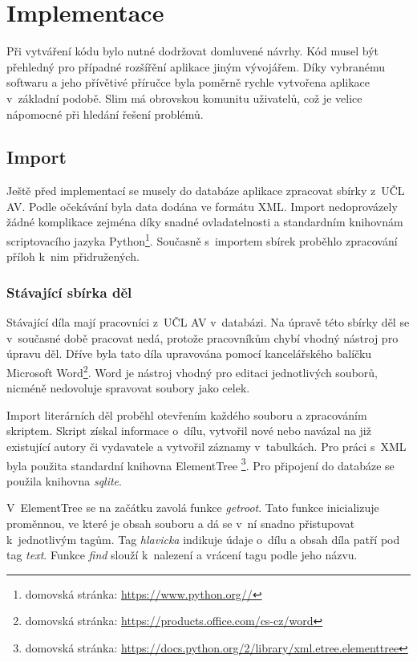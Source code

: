 \chapter{Implementace}
    Při vytváření kódu bylo nutné dodržovat domluvené návrhy. Kód musel být přehledný pro případné rozšířění aplikace jiným vývojářem. Díky vybranému softwaru a jeho přívětivé příručce byla poměrně rychle vytvořena aplikace v~základní podobě. Slim má obrovskou komunitu uživatelů, což je velice nápomocné při hledání řešení problémů. 

    \section{Import}
        Ještě před implementací se musely do databáze aplikace zpracovat sbírky z~UČL AV. Podle očekávání byla data dodána ve formátu XML. Import nedoprovázely žádné komplikace zejména díky snadné ovladatelnosti a standardním knihovnám scriptovacího jazyka Python\footnote{domovská stránka: \url{https://www.python.org//}}. Současně s~importem sbírek proběhlo zpracování příloh k~nim přidružených.
        
        \subsection{Stávající sbírka děl}
            Stávající díla mají pracovníci z~UČL AV v~databázi. Na úpravě této sbírky děl se v~současné době pracovat nedá, protože pracovníkům chybí vhodný nástroj pro úpravu děl. Dříve byla tato díla upravována pomocí kancelářského balíčku Microsoft Word\footnote{domovská stránka: \url{https://products.office.com/cs-cz/word}}. Word je nástroj vhodný pro editaci jednotlivých souborů, nicméně nedovoluje spravovat soubory jako celek.
            
            Import literárních děl proběhl otevřením každého souboru a zpracováním skriptem. Skript získal informace o~dílu, vytvořil nové nebo navázal na již existující autory či vydavatele a vytvořil záznamy v~tabulkách. Pro práci s~XML byla použita standardní knihovna ElementTree
            \footnote{domovská stránka: \href{https://docs.python.org/2/library/xml.etree .elementtree.html}{\url{ https://docs.python.org/2/library/xml.etree.elementtree}}}. Pro připojení do databáze se použila knihovna \textit{sqlite}.
            
            V~ElementTree se na začátku zavolá funkce \textit{getroot}. Tato funkce inicializuje proměnnou, ve které je obsah souboru a  dá se v~ní snadno přistupovat k~jednotlivým tagům. Tag \textit{hlavicka} indikuje údaje o~dílu a obsah díla patří pod tag \textit{text}. Funkce \textit{find} slouží k~nalezení a vrácení tagu podle jeho názvu.
            
